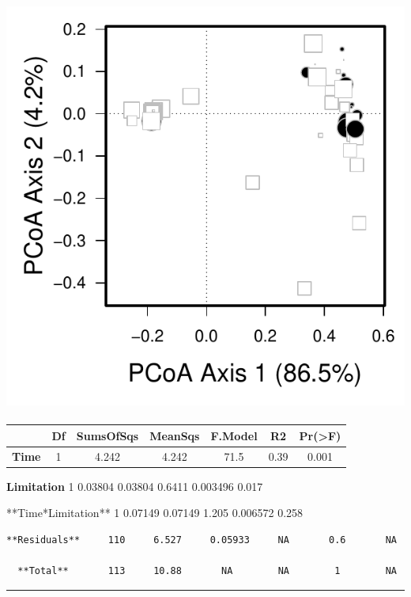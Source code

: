 \documentclass[]{article}
\begin{document}
\subsection{\texorpdfstring{\protect\includegraphics{analysis_ecoevostoich_files/figure-latex/unnamed-chunk-32-1.pdf}}{}}\label{section-2}

\begin{longtable}[]{@{}ccccccc@{}}
\toprule
~ & Df & SumsOfSqs & MeanSqs & F.Model & R2 &
Pr(\textgreater{}F)\tabularnewline
\midrule
\endhead
\textbf{Time} & 1 & 4.242 & 4.242 & 71.5 & 0.39 & 0.001\tabularnewline
\bottomrule
\end{longtable}

\textbf{Limitation} 1 0.03804 0.03804 0.6411 0.003496 0.017

**Time*Limitation** 1 0.07149 0.07149 1.205 0.006572 0.258

\begin{verbatim}
**Residuals**     110     6.527     0.05933     NA       0.6       NA   

  **Total**       113     10.88       NA        NA        1        NA   
\end{verbatim}

\begin{center}\rule{0.5\linewidth}{\linethickness}\end{center}
\end{document}
